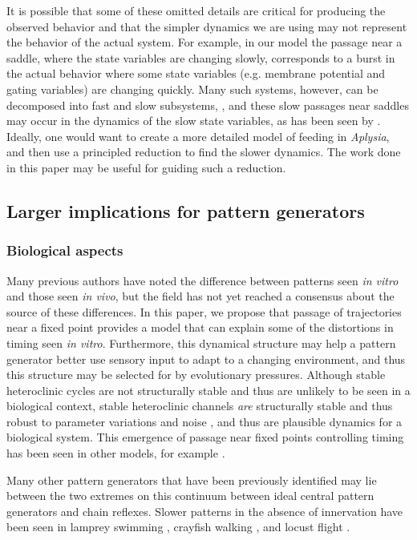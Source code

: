 It is possible that some of these omitted details are critical for producing
the observed behavior and that the simpler dynamics we are using may not
represent the behavior of the actual system.  For example, in our model the
passage near a saddle, where the state variables are changing slowly,
corresponds to a burst in the actual behavior where some state variables
(e.g. membrane potential and gating variables) are changing quickly.  Many
such systems, however, can be decomposed into fast and slow subsystems,
\citep{butera_dissection_1996,krupa_mixed-mode_2008,sherwood_dissecting_2010},
and
these slow passages near saddles may occur in the dynamics of the slow state
variables, as has been seen by \citet{nowotny_dynamical_2007}.  Ideally, one
would want to create a more detailed model of feeding in \textit{Aplysia}, and
then use a principled reduction to find the slower dynamics.  The work done in
this paper may be useful for guiding such a reduction.

\subsection{Larger implications for pattern generators}

\subsubsection{Biological aspects}

Many previous authors have noted the difference between patterns seen
\textit{in vitro} and those seen \textit{in vivo}, but the field has not yet
reached a consensus about the source of these differences.  In this paper, we
propose that passage of trajectories near a fixed point provides a model that
can explain some of the distortions in timing seen \textit{in vitro}.
Furthermore, this dynamical structure may help a pattern generator better use
sensory input to adapt to a changing environment, and thus this structure may
be selected for by evolutionary pressures.  Although stable heteroclinic cycles
are not structurally stable and thus are unlikely to be seen in a biological
context, stable heteroclinic channels \emph{are} structurally stable and thus
robust
to parameter variations and noise \citep{afraimovich_origin_2004}, and thus are
plausible dynamics for a
biological system.  This emergence of passage near
fixed points controlling timing has been seen in other models, for example
\citet{spardy_dynamical_2011}.

Many other pattern generators that have been previously identified may lie
between the two extremes on this continuum between ideal central pattern
generators and chain reflexes.  Slower patterns in the absence of innervation
have been seen in lamprey swimming \citep{wallen_fictive_1984}, crayfish
walking \citep{chrachri_fictive_1990}, and locust flight
\citep{pearson_phase-dependent_1983}.


